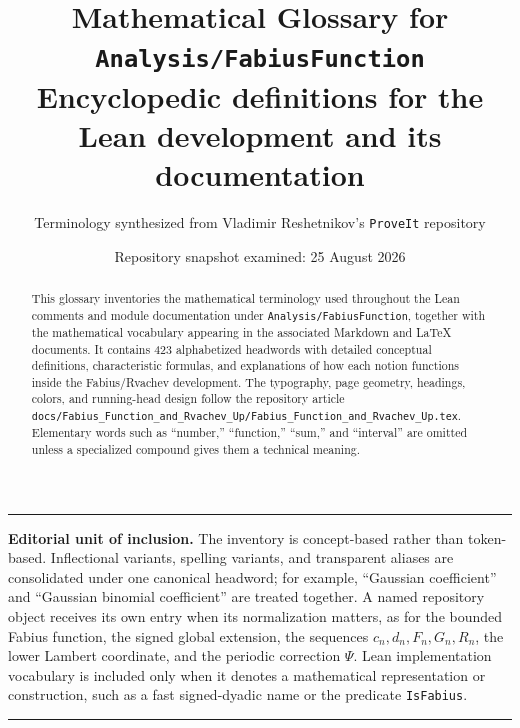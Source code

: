 \documentclass[11pt,oneside]{article}
\title{\bfseries Mathematical Glossary for \texttt{Analysis/FabiusFunction}\\[0.35em]
\large Encyclopedic definitions for the Lean development and its documentation}
\author{Terminology synthesized from Vladimir Reshetnikov's \texttt{ProveIt} repository}
\date{Repository snapshot examined: 25 August 2026}
\newcommand{\repo}{\nolinkurl{Analysis/FabiusFunction}}
\newenvironment{scopebox}{%
  \par\smallskip\noindent\begin{center}\begin{minipage}{0.94\textwidth}%
  \color{black}\hrule\vspace{0.6em}\small
}{%
  \vspace{0.6em}\hrule\end{minipage}\end{center}\smallskip
}
\begin{document}
\maketitle

\begin{abstract}
This glossary inventories the mathematical terminology used throughout the Lean comments and
module documentation under \repo, together with the mathematical vocabulary appearing in the
associated Markdown and LaTeX documents.  It contains 423 alphabetized headwords with detailed
conceptual definitions, characteristic formulas, and explanations of how each notion functions
inside the Fabius/Rvachev development.  The typography, page geometry, headings, colors, and
running-head design follow the repository article
\texttt{docs/Fabius\_Function\_and\_Rvachev\_Up/Fabius\_Function\_and\_Rvachev\_Up.tex}.
Elementary words such as ``number,'' ``function,'' ``sum,'' and ``interval'' are omitted unless
a specialized compound gives them a technical meaning.
\end{abstract}


\begin{scopebox}
\textbf{Editorial unit of inclusion.}
The inventory is concept-based rather than token-based.  Inflectional variants, spelling
variants, and transparent aliases are consolidated under one canonical headword; for example,
``Gaussian coefficient'' and ``Gaussian binomial coefficient'' are treated together.  A named
repository object receives its own entry when its normalization matters, as for the bounded
Fabius function, the signed global extension, the sequences $c_n,d_n,F_n,G_n,R_n$, the lower
Lambert coordinate, and the periodic correction $\Psi$.  Lean implementation vocabulary is
included only when it denotes a mathematical representation or construction, such as a fast
signed-dyadic name or the predicate \texttt{IsFabius}.
\end{scopebox}

\tableofcontents\newpage
\end{document}
